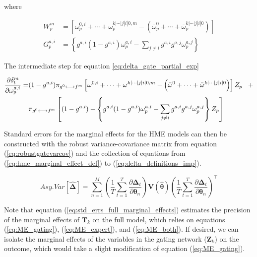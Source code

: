 \documentclass[12pt]{article}
\newcommand{\mean}[1]{\bar{#1}}
\newcommand{\gateprod}[2]{\pi_{#1 \longleftrightarrow #2}}
\begin{document}
where

\begin{align}
    W^{m}_{p}     &= \left[ \omega^{0, i}_{p} + \cdots + \omega^{k|\cdots|j|i|0, m}_{p} - \left( \mean{\omega}^{0}_{p} + \cdots + \mean{\omega}^{k|\cdots|j|i|0}_{p} \right) \right] \\
    G^{a,i}_{p} &= \left\{ g^{a,i} (1 - g^{a,i}) \omega^{a,i}_{p} - \sum_{j \neq i} g^{a,i} g^{a,j} \omega^{a,j}_{p} \right\}
\end{align}

The intermediate step for equation \ref{eq:delta_gate_partial_exp}

\begin{equation}
  \begin{split} \notag
    \frac{\partial \delta^{m}_{t}}{\partial \omega^{a,i}_{p}} =& (1 - g^{a,i})  \gateprod{g^{0}}{f^{m}}  \left[ \omega^{0, i} + \cdots + \omega^{k|\cdots|j|i|0, m} - \left( \mean{\omega}^{0} + \cdots + \mean{\omega}^{k|\cdots|j|i|0} \right) \right] Z_{p} \,\,\,\,\, + \\ 
    &\gateprod{g^{0}}{f^{m}} \left[ (1 - g^{a,i})  - \left\{ g^{a,i} (1 - g^{a,i}) \omega^{a,i}_{p} - \sum_{j \neq i} g^{a,i} g^{a,j} \omega^{a,j}_{p} \right\}  Z_{p}  \right]
  \end{split} 
\end{equation}

Standard errors for the marginal effects for the HME models can then be
constructed with the robust variance-covariance matrix from equation
(\ref{eq:robustgatevarcov}) and the collection of equations from
(\ref{eq:hme_marginal_effect_def}) to (\ref{eq:delta_definitions_imp}).


\begin{equation} \label{eq:std_errs_full_marginal_effects}
  Asy.Var \left[ \boldsymbol{ \hat{ \Delta } } \right] = \sum^{M}_{n=1}  \left( \frac{1}{T} \sum^{T}_{t=1} \frac{\partial \boldsymbol{\Delta}_{t}}{\partial \boldsymbol{\theta}_{n}} \right)     \boldsymbol{V}(\boldsymbol{\hat{\theta}})      \left( \frac{1}{T} \sum^{T}_{t=1} \frac{\partial \boldsymbol{\Delta}_{t}}{\partial \boldsymbol{\theta}_{n}} \right)^\top
\end{equation} 

Note that equation (\ref{eq:std_errs_full_marginal_effects}) estimates
the precision of the marginal effects of $\boldsymbol{T}_k$ on the full model,
which relies on equations (\ref{eq:ME_gating}), (\ref{eq:ME_expert}), and
(\ref{eq:ME_both}). If desired, we can isolate the marginal effects of 
the variables in the gating network ($\boldsymbol{Z}_k$) on the outcome,
which would take a slight modification of equation (\ref{eq:ME_gating}).
\end{document}
